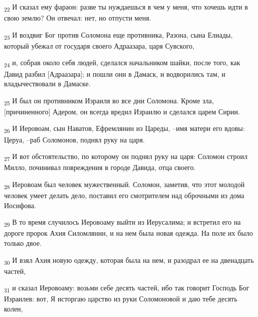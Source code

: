 \begin{tcolorbox}
\textsubscript{22} И сказал ему фараон: разве ты нуждаешься в чем у меня, что хочешь идти в свою землю? Он отвечал: нет, но отпусти меня.
\end{tcolorbox}
\begin{tcolorbox}
\textsubscript{23} И воздвиг Бог против Соломона еще противника, Разона, сына Елиады, который убежал от государя своего Адраазара, царя Сувского,
\end{tcolorbox}
\begin{tcolorbox}
\textsubscript{24} и, собрав около себя людей, сделался начальником шайки, после того, как Давид разбил [Адраазара]; и пошли они в Дамаск, и водворились там, и владычествовали в Дамаске.
\end{tcolorbox}
\begin{tcolorbox}
\textsubscript{25} И был он противником Израиля во все дни Соломона. Кроме зла, [причиненного] Адером, он всегда вредил Израилю и сделался царем Сирии.
\end{tcolorbox}
\begin{tcolorbox}
\textsubscript{26} И Иеровоам, сын Наватов, Ефремлянин из Цареды, --имя матери его вдовы: Церуа, --раб Соломонов, поднял руку на царя.
\end{tcolorbox}
\begin{tcolorbox}
\textsubscript{27} И вот обстоятельство, по которому он поднял руку на царя: Соломон строил Милло, починивал повреждения в городе Давида, отца своего.
\end{tcolorbox}
\begin{tcolorbox}
\textsubscript{28} Иеровоам был человек мужественный. Соломон, заметив, что этот молодой человек умеет делать дело, поставил его смотрителем над оброчными из дома Иосифова.
\end{tcolorbox}
\begin{tcolorbox}
\textsubscript{29} В то время случилось Иеровоаму выйти из Иерусалима; и встретил его на дороге пророк Ахия Силомлянин, и на нем была новая одежда. На поле их было только двое.
\end{tcolorbox}
\begin{tcolorbox}
\textsubscript{30} И взял Ахия новую одежду, которая была на нем, и разодрал ее на двенадцать частей,
\end{tcolorbox}
\begin{tcolorbox}
\textsubscript{31} и сказал Иеровоаму: возьми себе десять частей, ибо так говорит Господь Бог Израилев: вот, Я исторгаю царство из руки Соломоновой и даю тебе десять колен,
\end{tcolorbox}
